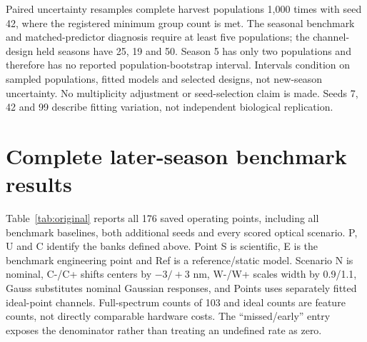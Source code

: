 \documentclass[10pt,a4paper]{article}
\begin{document}
Paired uncertainty resamples complete harvest populations 1,000 times with seed 42, where the registered minimum group count is met. The seasonal benchmark and matched-predictor diagnosis require at least five populations; the channel-design held seasons have 25, 19 and 50. Season 5 has only two populations and therefore has no reported population-bootstrap interval. Intervals condition on sampled populations, fitted models and selected designs, not new-season uncertainty. No multiplicity adjustment or seed-selection claim is made. Seeds 7, 42 and 99 describe fitting variation, not independent biological replication.

\section{Complete later-season benchmark results}
Table~\ref{tab:original} reports all 176 saved operating points, including all benchmark baselines, both additional seeds and every scored optical scenario. P, U and C identify the banks defined above. Point S is scientific, E is the benchmark engineering point and Ref is a reference/static model. Scenario N is nominal, C-/C+ shifts centers by $-3/+3$ nm, W-/W+ scales width by 0.9/1.1, Gauss substitutes nominal Gaussian responses, and Points uses separately fitted ideal-point channels. Full-spectrum counts of 103 and ideal counts are feature counts, not directly comparable hardware costs. The ``missed/early'' entry exposes the denominator rather than treating an undefined rate as zero.
\end{document}
